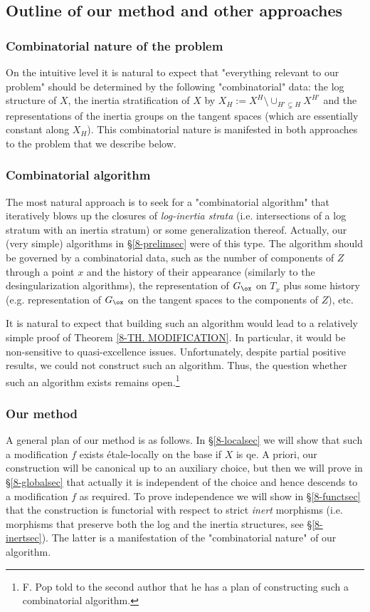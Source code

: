 \documentclass[10pt]{../fichiers-configuration-latex/smfart}
\begin{document}
\subsection{Outline of our method and other
approaches}\label{8-outlinesec}

\subsubsection{Combinatorial nature of the problem}\label{8-combsec}
On the intuitive level it is natural to expect that "everything
relevant to our problem" should be determined by the following
"combinatorial" data: the log structure of $X$, the inertia
stratification of $X$ by $X_H:=X^H\setminus\cup_{H'\subsetneq
H}X^{H'}$ and the representations of the inertia groups on the
tangent spaces (which are essentially constant along $X_H$). This
combinatorial nature is manifested in both approaches to the problem
that we describe below.

\subsubsection{Combinatorial algorithm}\label{8-algorsec}
The most natural approach is to seek for a "combinatorial
algorithm" that iteratively blows up the closures of {\em
log-inertia strata} (i.e. intersections of a log stratum with
an inertia stratum) or some generalization thereof. Actually, our (very simple) algorithms in
\S\ref{8-prelimsec} were of this type. The algorithm should be
governed by a combinatorial data, such as the number of components
of $Z$ through a point $x$ and the history of their appearance
(similarly to the desingularization algorithms), the representation
of $G_\ox$ on $T_x$ plus some history (e.g. representation of $G_\ox$
on the tangent spaces to the components of $Z$), etc.

It is natural to expect that building such an algorithm would lead to
a relatively simple proof of Theorem \ref{8-TH. MODIFICATION}. In
particular, it would be non-sensitive to quasi-excellence
issues. Unfortunately, despite partial positive results, we could
not construct such an algorithm.
Thus, the question whether such an algorithm exists remains
open.\footnote{F. Pop told to the second author that he has a plan
of constructing such a combinatorial algorithm.}

\subsubsection{Our method}\label{8-ourmethodsec} A general plan
of our method is as follows. In \S\ref{8-localsec} we will show
that such a modification $f$ exists \'etale-locally on the base
if $X$ is qe. A priori, our construction will be canonical up to
an auxiliary choice, but then we will prove in \S\ref{8-globalsec}
that actually it is independent of the choice and hence descends to a
modification $f$ as required. To prove independence we will show in
\S\ref{8-functsec} that the construction is functorial with respect
to strict {\em inert} morphisms (i.e. morphisms that preserve both
the log and the inertia structures, see \S\ref{8-inertsec}). The
latter is a manifestation of the "combinatorial nature" of our
algorithm.
\end{document}
